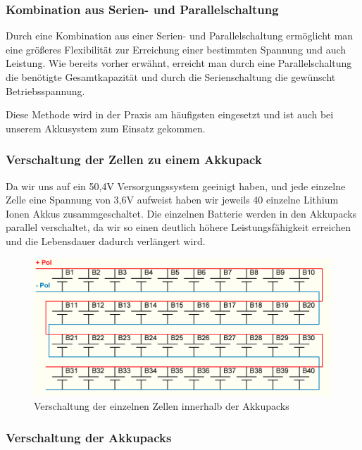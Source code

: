 \subsubsection{Kombination aus Serien- und Parallelschaltung}
Durch eine Kombination aus einer Serien- und Parallelschaltung ermöglicht man eine größeres Flexibilität zur Erreichung einer bestimmten Spannung und auch Leistung. Wie bereits vorher erwähnt, erreicht man durch eine Parallelschaltung die benötigte Gesamtkapazität und durch die Serienschaltung die gewünscht Betriebsspannung.

Diese Methode wird in der Praxis am häufigsten eingesetzt und ist auch bei unserem Akkusystem zum Einsatz gekommen.

\subsubsection{Verschaltung der Zellen zu einem Akkupack}

Da wir uns auf ein 50,4V Versorgungssystem geeinigt haben, und jede einzelne Zelle eine Spannung von 3,6V aufweist haben wir jeweils 40 einzelne Lithium Ionen Akkus zusammgeschaltet. Die einzelnen Batterie werden in den Akkupacks parallel verschaltet, da wir so einen deutlich höhere Leistungsfähigkeit erreichen und die Lebensdauer dadurch verlängert wird. 

\begin{figure}[H]
	\begin{center}
		\includegraphics[scale=0.6]{figures/Akku/Anschlussplan 40Zellen.PNG}
		\caption{Verschaltung der einzelnen Zellen innerhalb der Akkupacks}
		\label{fig: Verschaltung der einzelnen Zellen innerhalb der Akkupacks}
	\end{center}
\end{figure}
\newpage

\subsubsection{Verschaltung der Akkupacks}

